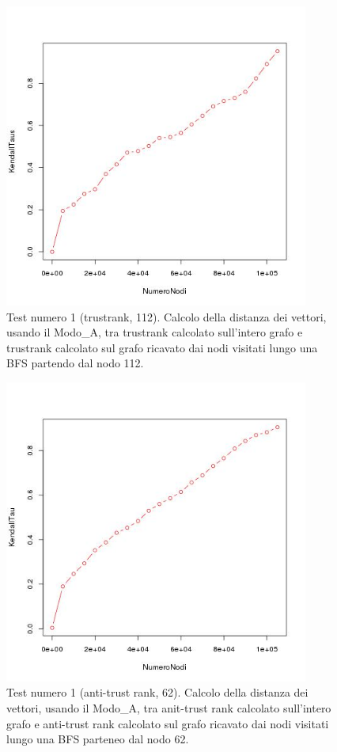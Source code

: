  \begin{figure}
\centering
 \includegraphics[width=10cm]{immagini/test1/trustranktestMode0_112}
 \caption{Test numero 1 (trustrank, 112). Calcolo della distanza dei vettori, usando il Modo\_A, tra trustrank calcolato sull'intero grafo e trustrank calcolato sul grafo ricavato dai nodi visitati lungo una BFS partendo dal nodo 112.}
 \label{fig:test1trustModoA112}
\end{figure}
 \begin{figure}
\centering
 \includegraphics[width=10cm]{immagini/test1/antiTrustrankTestMode0_62}
 \caption{Test numero 1 (anti-trust rank, 62). Calcolo della distanza dei vettori, usando il Modo\_A, tra anit-trust rank calcolato sull'intero grafo e anti-trust rank calcolato sul grafo ricavato dai nodi visitati lungo una BFS parteneo dal nodo 62.}
 \label{fig:test1antitrustModoA62}
\end{figure}
